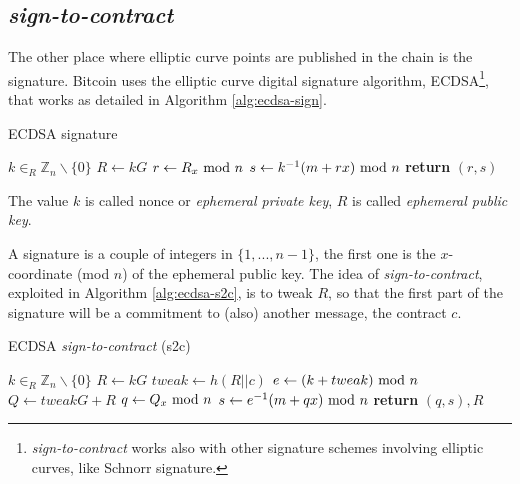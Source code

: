 \subsection{\textit{sign-to-contract}}
The other place where elliptic curve points are published in the chain is the signature. Bitcoin uses the elliptic curve digital signature algorithm, ECDSA\footnote{\textit{sign-to-contract} works also with other signature schemes involving elliptic curves, like Schnorr signature.}, that works as detailed in Algorithm \ref{alg:ecdsa-sign}.
\begin{algorithm}
	\caption{ECDSA signature}
	\label{alg:ecdsa-sign}
	\begin{algorithmic}[1]
		\Statex {}
		\State $k \in_R \mathbb{Z}_n \backslash \{0\}$ 
		\State $R \gets k G$
		\State $r \gets R_x \textmd{ mod }n$
		\State $s \gets k^{-1}(m + rx) \textmd{ mod }n$
		\State \textbf{return} $(r,s)$
		\EndProcedure
	\end{algorithmic}
\end{algorithm}
The value $k$ is called nonce or \textit{ephemeral private key}, $R$ is called \textit{ephemeral public key}.

A signature is a couple of integers in $\{1,...,n-1\}$, the first one is the $x$-coordinate (mod $n$) of the ephemeral public key.
The idea of \textit{sign-to-contract}, exploited in Algorithm \ref{alg:ecdsa-s2c}, is to tweak $R$, so that the first part of the signature will be a commitment to (also) another message, the contract $c$.
\begin{algorithm}
	\caption{ECDSA \textit{sign-to-contract} (s2c)}
	\label{alg:ecdsa-s2c}
	\begin{algorithmic}[1]
		\Statex {}
		\Statex {}
		\State $k \in_R \mathbb{Z}_n \backslash \{0\}$ 
		\State $R \gets k G$
		\State $tweak \gets h(R||c)$
		\State $e \gets (k + tweak) \textmd{ mod }n$ 
		\State $Q \gets tweak G + R$
		\State $q \gets Q_x \textmd{ mod }n$
		\Statex {}
		\State $s \gets e^{-1}(m + qx) \textmd{ mod }n$
		\State \textbf{return} $(q,s), R$
		\EndProcedure
	\end{algorithmic}
\end{algorithm}

